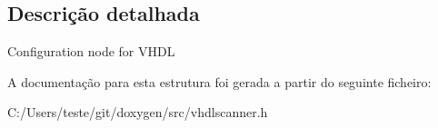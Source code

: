 \subsection{Descrição detalhada}
Configuration node for V\-H\-D\-L 

A documentação para esta estrutura foi gerada a partir do seguinte ficheiro\-:\begin{DoxyCompactItemize}
\item 
C\-:/\-Users/teste/git/doxygen/src/vhdlscanner.\-h\end{DoxyCompactItemize}
